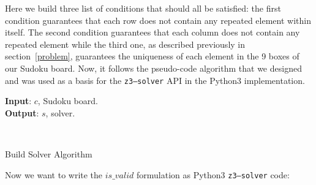 \documentclass[]{usiinfprospectus}
\newcounter{row}
\newcounter{col}
\begin{document}
\noindent
Here we build three list of conditions that should all be satisfied: the first condition guarantees that each row does not contain any repeated element within itself. The second condition guarantees that each column does not contain any repeated element while the third one, as described previously
in section~\ref{problem}, guarantees the uniqueness of each element in the 9 boxes of our Sudoku board. Now, it follows the pseudo-code algorithm that we designed and was used as a basis for the \texttt{z3–solver} API in the Python3 implementation.
\begin{algorithm}[H]
\hspace*{\algorithmicindent} \textbf{Input}: $c$, Sudoku board. \\
\hspace*{\algorithmicindent} \textbf{Output}: $s$, solver. 
\begin{algorithmic}[1]\label{algorithm:}
 
\EndFor
{} 
\EndFor
{} 
\EndFor
\EndFor
{}
\\
\EndFunction
\end{algorithmic}
\caption {Build Solver Algorithm}
\end{algorithm}

\newpage
\noindent
Now we want to write the $ is\_valid $ formulation as Python3 \texttt{z3–solver}
code:
\end{document}
